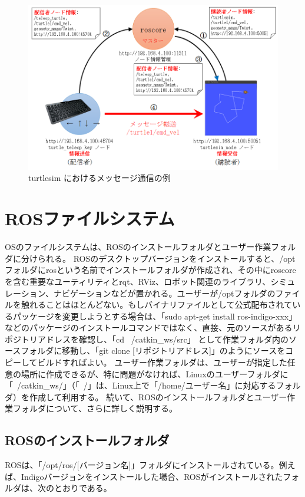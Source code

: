 \begin{figure}[h]
  \centering
  \includegraphics[width=12cm]{pictures/chapter3/pic_03_13.png}
  \caption{turtlesim におけるメッセージ通信の例}
\end{figure}

\section{ROSファイルシステム}
OSのファイルシステムは、ROSのインストールフォルダとユーザー作業フォルダに分けられる。
ROSのデスクトップバージョンをインストールすると、/optフォルダにrosという名前でインストールフォルダが作成され、その中にroscoreを含む重要なユーティリティとrqt、RViz、ロボット関連のライブラリ、シミュレーション、ナビゲーションなどが置かれる。ユーザーが/optフォルダのファイルを触れることはほとんどない。もしバイナリファイルとして公式配布されているパッケージを変更しようとする場合は、「sudo apt-get install ros-indigo-xxx」などのパッケージのインストールコマンドではなく、直接、元のソースがあるリポジトリアドレスを確認し、「cd ~/catkin\_ws/src」 として作業フォルダ内のソースフォルダに移動し、「git clone [リポジトリアドレス]」のようにソースをコピーしてビルドすればよい。
ユーザー作業フォルダは、ユーザーが指定した任意の場所に作成できるが、特に問題がなければ、Linuxのユーザーフォルダに「~/catkin\_ws/」（「~/」は、Linux上で「/home/ユーザー名」に対応するフォルダ）を作成して利用する。
続いて、ROSのインストールフォルダとユーザー作業フォルダについて、さらに詳しく説明する。

\subsection{ROSのインストールフォルダ}
ROSは、「/opt/ros/[バージョン名]」フォルダにインストールされている。例えば、Indigoバージョンをインストールした場合、ROSがインストールされたフォルダは、次のとおりである。

